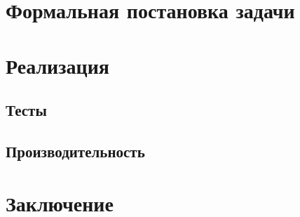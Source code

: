\documentclass{article}
\begin{document}
\section{Формальная постановка задачи}
\newpage

\section{Реализация}
\subsection{Тесты}
\subsection{Производительность}
\newpage

\section{Заключение}

\newpage


\end{document}
